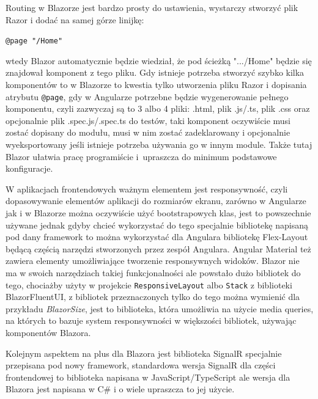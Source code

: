 \documentclass[12pt,a4paper,oneside]{book}
\begin{document}
Routing w Blazorze jest bardzo prosty do ustawienia, wystarczy stworzyć plik Razor i dodać na samej górze linijkę:
\begin{center}
  \texttt{@page "/Home"}
\end{center}
wtedy Blazor automatycznie będzie wiedział, że pod ścieżką ".../Home" będzie się znajdował komponent z tego pliku. Gdy istnieje potrzeba stworzyć szybko kilka komponentów to w Blazorze to kwestia tylko utworzenia pliku Razor i dopisania atrybutu \texttt{@page}, gdy w Angularze potrzebne będzie wygenerowanie pełnego komponentu, czyli zazwyczaj są to 3 albo 4 pliki: .html, plik .js/.ts, plik .css oraz opcjonalnie plik .spec.js/.spec.ts do testów, taki komponent oczywiście musi zostać dopisany do modułu, musi w nim zostać zadeklarowany i opcjonalnie wyeksportowany jeśli istnieje potrzeba używania go w innym module. Także tutaj Blazor ułatwia pracę programiście i~upraszcza do minimum podstawowe konfiguracje.

W aplikacjach frontendowych ważnym elementem jest responsywność, czyli dopasowywanie elementów aplikacji do rozmiarów ekranu, zarówno w Angularze jak i w Blazorze można oczywiście użyć bootstrapowych klas, jest to powszechnie używane jednak gdyby chcieć wykorzystać do tego specjalnie bibliotekę napisaną pod dany framework to można wykorzystać dla Angulara bibliotekę Flex-Layout będącą częścią narzędzi stworzonych przez zespół Angulara. Angular Material też zawiera elementy umożliwiające tworzenie responsywnych widoków. Blazor nie ma w swoich narzędziach takiej funkcjonalności ale powstało dużo bibliotek do tego, chociażby użyty w projekcie \texttt{ResponsiveLayout} albo \texttt{Stack} z biblioteki BlazorFluentUI, z bibliotek przeznaczonych tylko do tego można wymienić dla przykładu \textit{BlazorSize}, jest to biblioteka, która umożliwia na użycie media queries, na których to bazuje system responsywności w większości bibliotek, używając komponentów Blazora.

Kolejnym aspektem na plus dla Blazora jest biblioteka SignalR specjalnie przepisana pod nowy framework, standardowa wersja SignalR dla części frontendowej to biblioteka napisana w JavaScript/TypeScript ale wersja dla Blazora jest napisana w C\# i o wiele upraszcza to jej użycie.
\end{document}
